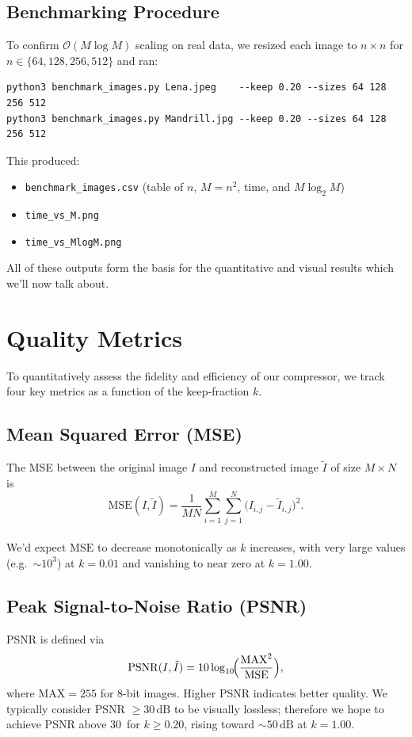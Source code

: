 \documentclass[12pt]{article}
\begin{document}
\subsection{Benchmarking Procedure}
To confirm $\mathcal{O}(M\log M)$ scaling on real data, we resized each image to \(n\times n\) for \(n\in\{64,128,256,512\}\) and ran:
\begin{verbatim}
python3 benchmark_images.py Lena.jpeg    --keep 0.20 --sizes 64 128 256 512
python3 benchmark_images.py Mandrill.jpg --keep 0.20 --sizes 64 128 256 512
\end{verbatim}
This produced:
\begin{itemize}
  \item \texttt{benchmark\_images.csv}   (table of $n$, $M=n^2$, time, and $M\log_2M$)  
  \item \texttt{time\_vs\_M.png}  
  \item \texttt{time\_vs\_MlogM.png}  
\end{itemize}

\noindent All of these outputs form the basis for the quantitative and visual results which we'll now talk about.

\section{Quality Metrics}
To quantitatively assess the fidelity and efficiency of our compressor, we track four key metrics as a function of the keep‐fraction \(k\).

\subsection{Mean Squared Error (MSE)}
The MSE between the original image \(I\) and reconstructed image \(\tilde I\) of size \(M\times N\) is
\[
\mathrm{MSE}(I,\tilde I)
=\frac{1}{MN}\sum_{i=1}^M\sum_{j=1}^N\bigl(I_{i,j}-\tilde I_{i,j}\bigr)^2.
\]
\\
\noindent We'd expect \(\mathrm{MSE}\) to decrease monotonically as \(k\) increases, with very large values (e.g.\ \(\sim10^3\)) at \(k=0.01\) and vanishing to near zero at \(k=1.00\).

\subsection{Peak Signal-to-Noise Ratio (PSNR)}
PSNR is defined via
\[
\mathrm{PSNR}(I,\tilde I)
=10\log_{10}\!\Bigl(\frac{\mathrm{MAX}^2}{\mathrm{MSE}}\Bigr),
\]
\noindent where \(\mathrm{MAX}=255\) for 8-bit images. Higher PSNR indicates better quality. We typically consider PSNR $\geq 30\,\text{dB}$ to be visually lossless; therefore we hope to achieve PSNR above 30\, for $k\geq 0.20$, rising toward $\sim50\,\text{dB}$ at \(k=1.00\).
\end{document}
